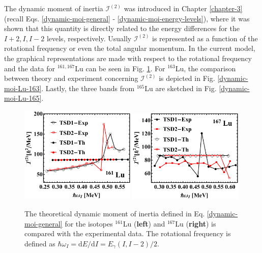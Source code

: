 The dynamic moment of inertia $\mathcal{I}^{(2)}$ was introduced in Chapter \ref{chapter-3} (recall Eqs. \ref{dynamic-moi-general} - \ref{dynamic-moi-energy-levels}), where it was shown that this quantity is directly related to the energy differences for the $I+2,I,I-2$ levels, respectively. Usually $\mathcal{I}^{(2)}$ is represented as a function of the rotational frequency or even the total angular momentum. In the current model, the graphical representations are made with respect to the rotational frequency and the data for $^{161,167}$Lu can be seen in Fig. \ref{dynamic-moi-Lu-161-167}. For $^{163}$Lu, the comparison between theory and experiment concerning $\mathcal{I}^{(2)}$ is depicted in Fig. \ref{dynamic-moi-Lu-163}. Lastly, the three bands from $^{165}$Lu are sketched in Fig. \ref{dynamic-moi-Lu-165}.
\begin{figure}
    \centering
    \includegraphics[width=0.49\textwidth]{Chapters/Figures/Lu-exp-energies/fig15_lu161.pdf}
    \includegraphics[width=0.49\textwidth]{Chapters/Figures/Lu-exp-energies/fig18_lu167.pdf}
    \caption{The theoretical dynamic moment of inertia defined in Eq. \ref{dynamic-moi-general} for the isotopes $^{161}$Lu (\textbf{left}) and $^{167}$Lu (\textbf{right}) is compared with the experimental data. The rotational frequency is defined as $\hbar\omega_I=\text{d}E/\text{d}I=E_\gamma(I,I-2)/2$.}
    \label{dynamic-moi-Lu-161-167}
\end{figure}
